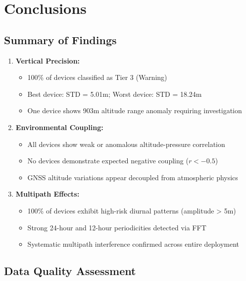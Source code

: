 \documentclass[11pt,a4paper]{article}
\begin{document}
\newpage

\section{Conclusions}

\subsection{Summary of Findings}

\begin{enumerate}
    \item \textbf{Vertical Precision:}
    \begin{itemize}
        \item 100\% of devices classified as Tier 3 (Warning)
        \item Best device: STD = 5.01m; Worst device: STD = 18.24m
        \item One device shows 903m altitude range anomaly requiring investigation
    \end{itemize}

    \item \textbf{Environmental Coupling:}
    \begin{itemize}
        \item All devices show weak or anomalous altitude-pressure correlation
        \item No devices demonstrate expected negative coupling ($r < -0.5$)
        \item GNSS altitude variations appear decoupled from atmospheric physics
    \end{itemize}

    \item \textbf{Multipath Effects:}
    \begin{itemize}
        \item 100\% of devices exhibit high-risk diurnal patterns (amplitude > 5m)
        \item Strong 24-hour and 12-hour periodicities detected via FFT
        \item Systematic multipath interference confirmed across entire deployment
    \end{itemize}
\end{enumerate}

\subsection{Data Quality Assessment}
\end{document}
